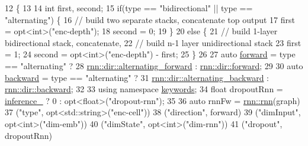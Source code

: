 \begin{DoxyCode}
12                                        \{
13 
14     \textcolor{keywordtype}{int} first, second;
15     \textcolor{keywordflow}{if}(type == \textcolor{stringliteral}{"bidirectional"} || type == \textcolor{stringliteral}{"alternating"}) \{
16       \textcolor{comment}{// build two separate stacks, concatenate top output}
17       first = opt<int>(\textcolor{stringliteral}{"enc-depth"});
18       second = 0;
19     \}
20     \textcolor{keywordflow}{else} \{
21       \textcolor{comment}{// build 1-layer bidirectional stack, concatenate,}
22       \textcolor{comment}{// build n-1 layer unidirectional stack}
23       first = 1;
24       second = opt<int>(\textcolor{stringliteral}{"enc-depth"}) - first;
25     \}
26 
27     \textcolor{keyword}{auto} \hyperlink{namespacemarian_1_1rnn_acba2ce4446fe9654f1fd2c69793e34caa965dbaac085fc891bfbbd4f9d145bbc8}{forward} = type == \textcolor{stringliteral}{"alternating"} ?
28       \hyperlink{namespacemarian_1_1rnn_acba2ce4446fe9654f1fd2c69793e34caad6b112d6a37f8db13390a2126c6062db}{rnn::dir::alternating\_forward} : 
      \hyperlink{namespacemarian_1_1rnn_acba2ce4446fe9654f1fd2c69793e34caa965dbaac085fc891bfbbd4f9d145bbc8}{rnn::dir::forward};
29 
30     \textcolor{keyword}{auto} \hyperlink{namespacemarian_1_1rnn_acba2ce4446fe9654f1fd2c69793e34caa195fe59b6f103787a914aead0f3db502}{backward} = type == \textcolor{stringliteral}{"alternating"} ?
31       \hyperlink{namespacemarian_1_1rnn_acba2ce4446fe9654f1fd2c69793e34caa1ed5c7d56d5fcbea1a3d07070a447bbd}{rnn::dir::alternating\_backward} : 
      \hyperlink{namespacemarian_1_1rnn_acba2ce4446fe9654f1fd2c69793e34caa195fe59b6f103787a914aead0f3db502}{rnn::dir::backward};
32 
33     \textcolor{keyword}{using namespace }\hyperlink{namespacekeywords}{keywords};
34     \textcolor{keywordtype}{float} dropoutRnn = \hyperlink{classmarian_1_1EncoderBase_a3543e255f5547f556c6ba30220ee2f2c}{inference\_} ? 0 : opt<float>(\textcolor{stringliteral}{"dropout-rnn"});
35 
36     \textcolor{keyword}{auto} rnnFw = \hyperlink{namespacemarian_1_1rnn_aff1b115e415945b445f8d4a2068ec3e8}{rnn::rnn}(graph)
37                  (\textcolor{stringliteral}{"type"}, opt<std::string>(\textcolor{stringliteral}{"enc-cell"}))
38                  (\textcolor{stringliteral}{"direction"}, forward)
39                  (\textcolor{stringliteral}{"dimInput"}, opt<int>(\textcolor{stringliteral}{"dim-emb"}))
40                  (\textcolor{stringliteral}{"dimState"}, opt<int>(\textcolor{stringliteral}{"dim-rnn"}))
41                  (\textcolor{stringliteral}{"dropout"}, dropoutRnn)

\end{DoxyCode}
